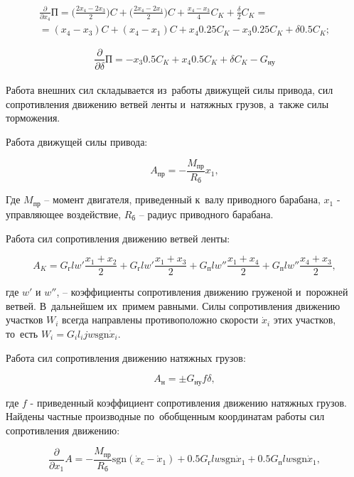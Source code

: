  \begin{eqnarray} \frac{\partial}{\partial x_4}\text{П} = \Big( \frac{2x_4 - 2x_3}{2} \Big) C + \Big( \frac{2x_4 - 2x_1}{2} \Big)C + \frac{x_4 - x_3}{4}C_K + \frac{\delta}{2}C_K = \nonumber \\ = (x_4 - x_3)C + (x_4 - x_1)C + x_4 0.25 C_K - x_3 0.25 C_K + \delta 0.5 C_K;  \nonumber \end{eqnarray}

$$ \frac{\partial}{\partial \delta}\text{П} = -x_3 0.5 C_K + x_4 0.5 C_K + \delta C_K - G_{\text{ну}}$$\\

Работа внешних сил складывается из~работы движущей силы привода, сил сопротивления движению ветвей ленты и~натяжных грузов, а~также силы торможения.

Работа движущей силы привода:

$$ A_{\text{пр}} = - \frac{ M_{\text{пр}} }{ R_{\text{б}} } x_1, $$

Где $ M_{\text{пр}} $ – момент двигателя, приведенный к~валу приводного барабана, $x_1$ - управляющее воздействие, $ R_{\text{б}} $ – радиус приводного барабана.

Работа сил сопротивления движению ветвей ленты:

$$ A_K = G_{\text{г}} l w' \frac{x_1 + x_2}{2}  + 
                G_{\text{г}} l w' \frac{x_1 + x_3}{2}  + 
                G_{\text{п}} l w'' \frac{x_1 + x_4}{2} + 
                G_{\text{п}} l w'' \frac{x_4 + x_3}{2}, 
$$

где  $ w' $ и $ w'' $, – коэффициенты сопротивления движению груженой и~порожней ветвей. В~дальнейшем их~примем равными. Силы сопротивления движению участков $ W_i $  всегда направлены противоположно скорости $ \dot x_i $ этих участков, то~есть $ W_i = G_i l_ij w \text{sgn} \dot x_i $.

Работа сил сопротивления движению натяжных грузов:

$$ A_{\text{н}} = \pm G_{\text{ну}} f \delta , $$

где $ f $ - приведенный коэффициент сопротивления движению натяжных грузов.\\

Найдены частные производные по~обобщенным координатам работы сил сопротивления движению:

$$ \frac{ \partial }{ \partial x_1} A = - \frac{ M_{\text{пр}} }{ R_{\text{б}} } \text{sgn} ( \dot x_c - \dot x_1 ) + 0.5 G_{\text{г}} l w \text{sgn} \dot x_1 +  0.5 G_{\text{п}} l w \text{sgn} \dot x_1, $$


